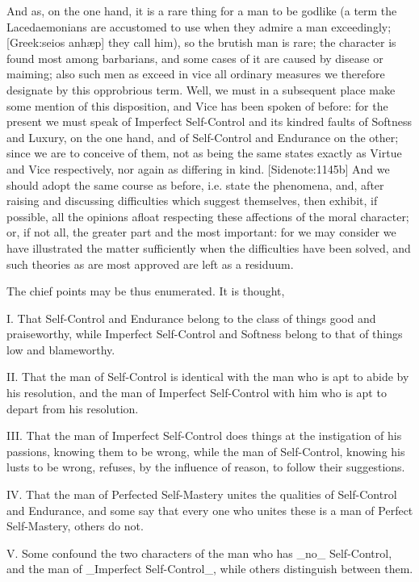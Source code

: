 And as, on the one hand, it is a rare thing for a man to be godlike (a
term the Lacedaemonians are accustomed to use when they admire a man
exceedingly; [Greek:seios anhæp] they call him), so the brutish man is
rare; the character is found most among barbarians, and some cases of it
are caused by disease or maiming; also such men as exceed in vice all
ordinary measures we therefore designate by this opprobrious term. Well,
we must in a subsequent place make some mention of this disposition,
and Vice has been spoken of before: for the present we must speak of
Imperfect Self-Control and its kindred faults of Softness and Luxury, on
the one hand, and of Self-Control and Endurance on the other; since we
are to conceive of them, not as being the same states exactly as Virtue
and Vice respectively, nor again as differing in kind. [Sidenote:1145b]
And we should adopt the same course as before, i.e. state the phenomena,
and, after raising and discussing difficulties which suggest themselves,
then exhibit, if possible, all the opinions afloat respecting these
affections of the moral character; or, if not all, the greater part and
the most important: for we may consider we have illustrated the matter
sufficiently when the difficulties have been solved, and such theories
as are most approved are left as a residuum.

The chief points may be thus enumerated. It is thought,

I. That Self-Control and Endurance belong to the class of things good
and praiseworthy, while Imperfect Self-Control and Softness belong to
that of things low and blameworthy.

II. That the man of Self-Control is identical with the man who is apt to
abide by his resolution, and the man of Imperfect Self-Control with him
who is apt to depart from his resolution.

III. That the man of Imperfect Self-Control does things at the
instigation of his passions, knowing them to be wrong, while the man of
Self-Control, knowing his lusts to be wrong, refuses, by the influence
of reason, to follow their suggestions.

IV. That the man of Perfected Self-Mastery unites the qualities of
Self-Control and Endurance, and some say that every one who unites these
is a man of Perfect Self-Mastery, others do not.

V. Some confound the two characters of the man who has _no_
Self-Control, and the man of _Imperfect Self-Control_, while others
distinguish between them.


